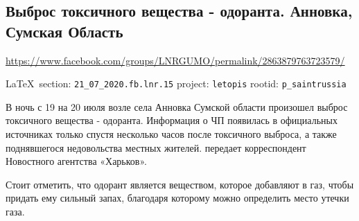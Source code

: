  
 
\subsection{Выброс токсичного вещества - одоранта. Анновка, Сумская Область}
\url{https://www.facebook.com/groups/LNRGUMO/permalink/2863879763723579/}
  
\vspace{0.5cm}
{\small\LaTeX~section: \verb|21_07_2020.fb.lnr.15| project: \verb|letopis| rootid: \verb|p_saintrussia|}
\vspace{0.5cm}

В ночь с 19 на 20 июля возле села Анновка Сумской области произошел выброс
токсичного вещества - одоранта. Информация о ЧП появилась в официальных
источниках только спустя несколько часов после токсичного выброса, а также
поднявшегося недовольства местных жителей. передает корреспондент Новостного
агентства «Харьков».  

Стоит отметить, что одорант является веществом, которое
добавляют в газ, чтобы придать ему сильный запах, благодаря которому можно
определить место утечки газа.

  

